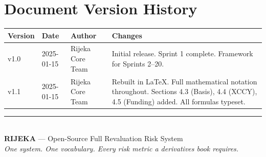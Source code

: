 \documentclass[11pt, a4paper]{article}
\begin{document}
\section{Document Version History}

\begin{center}
\begin{tabular}{L{1.5cm} L{2cm} L{3cm} L{6cm}}
\toprule
\textbf{Version} & \textbf{Date} & \textbf{Author} & \textbf{Changes} \\
\midrule
v1.0 & 2025-01-15 & Rijeka Core Team
     & Initial release. Sprint 1 complete. Framework for Sprints 2–20. \\
v1.1 & 2025-01-15 & Rijeka Core Team
     & Rebuilt in \LaTeX. Full mathematical notation throughout.
       Sections 4.3 (Basis), 4.4 (XCCY), 4.5 (Funding) added.
       All formulas typeset. \\
\bottomrule
\end{tabular}
\end{center}

\vspace{1cm}
\begin{center}
\textcolor{mgrey}{\rule{12cm}{0.4pt}}\\[0.4cm]
{\small\color{dgrey}
\textbf{RIJEKA} — Open-Source Full Revaluation Risk System\\[0.1cm]
\textit{One system. One vocabulary. Every risk metric a derivatives book requires.}
}
\end{center}
\end{document}
